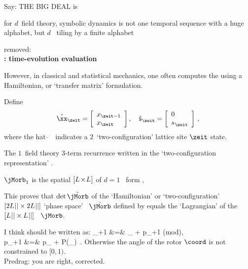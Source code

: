 \begin{description}
 {
Say: THE BIG DEAL is

for $d$\dmn\ field theory, symbolic dynamics is not one temporal sequence
with a huge alphabet, but $d$\dmn\ {\spt} tiling by a finite alphabet
   }

 {removed:\\
{\bf {\HillDet}: time-evolution evaluation}

However, in classical and statistical mechanics, one often computes the
{\HillDet} using a  Hamiltonian, or `transfer matrix' formulation.

Define
\[  %
\hat{\xx}_\zeit
=
\left[\begin{array}{l}
 {\ssp}_{\zeit-1}\\
 {\ssp}_\zeit
 \end{array}\right]
,\quad
\hat{\mathsf{\Ssym{}}}_\zeit
=
    \left[\begin{array}{l}
    {0}\\
 {\Ssym{}}_{\zeit}
 \end{array}\right]
\,,
\] %
where the hat $\hat{~}$~ indicates a $2$\dmn\
`two-configuration' lattice site $\zeit$ state.

The $1$\dmn\ field theory 3-term recurrence  written
in the \PV\rf{PerViv} `two-configuration representation'
.


$\mathbf{\jMorb}_1$ is the spatial
$[{L_{}}\!\times\!{L_{}}]$ {\jacobianOrb} of
$d=1$ \templatt\ form ,


This proves that $\det\hat{\mathbf{\jMorb}}$ of the
`Hamiltonian' or `two-configuration'
$[2{L_{}}{||}\times2{L_{}}{||}]$ `phase space'
\jacobianOrb\ $\hat{\mathbf{\jMorb}}$ defined by 
equals the `Lagrangian' {\HillDet} of the
$[{L_{}}{||}\times{\ensuremath{L_{}}}{\ensuremath{||}}]$ \jacobianOrb\
$\mathbf{\jMorb}$.
    }

     {
I think  should be written as:
\bea
\coord_{\zeit+1} &=& \coord_{\zeit} + p_{\zeit+1} \qquad  (\mbox{mod}), \\
p_{\zeit+1} &=& p_{\zeit} + P(\coord_{\zeit}) \,.
\eea
Otherwise the angle of the rotor $\coord$ is not constrained to $[0,1)$.
\\Predrag: you are right, corrected.
}


\end{description}
